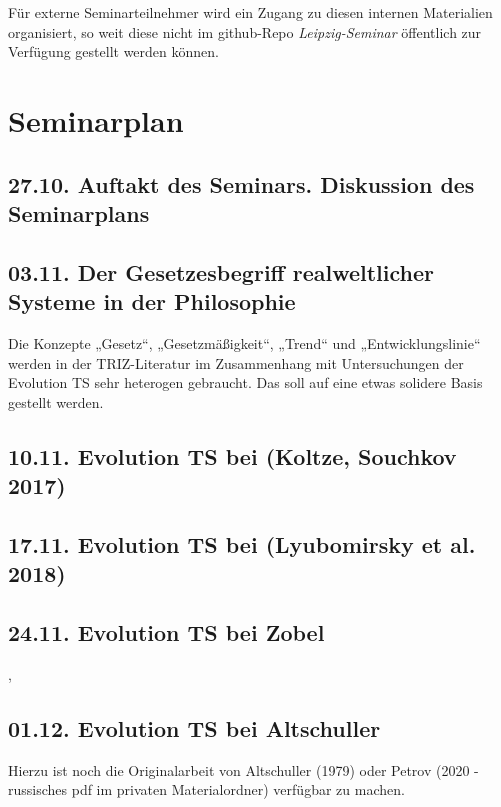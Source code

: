 \documentclass[11pt,a4paper]{article}
\begin{document}
Für externe Seminarteilnehmer wird ein Zugang zu diesen internen Materialien
organisiert, so weit diese nicht im github-Repo \emph{Leipzig-Seminar}
öffentlich zur Verfügung gestellt werden können.

\section{Seminarplan}

\subsection*{27.10. Auftakt des Seminars. Diskussion des Seminarplans}

\subsection*{03.11. Der Gesetzesbegriff realweltlicher Systeme in der
  Philosophie}

Die Konzepte „Gesetz“, „Gesetzmäßigkeit“, „Trend“ und „Entwicklungslinie“
werden in der TRIZ-Literatur im Zusammenhang mit Untersuchungen der Evolution
TS sehr heterogen gebraucht. Das soll auf eine etwas solidere Basis gestellt
werden. 

\subsection*{10.11. Evolution TS bei (Koltze, Souchkov 2017) } 

\cite[Abschnitt 4.12.]{KoltzeSouchkov2017}

\subsection*{17.11. Evolution TS bei (Lyubomirsky et al. 2018)}

\cite{TESE2018}

\subsection*{24.11. Evolution TS bei Zobel}

\cite[Abschnitt 3.3.3]{Zobel2007}, \cite[Abschnitt 3.4]{Zobel2020}

\subsection*{01.12. Evolution TS bei Altschuller}

Hierzu ist noch die Originalarbeit von Altschuller (1979) oder Petrov (2020 -
russisches pdf im privaten Materialordner) verfügbar zu machen.
\end{document}
